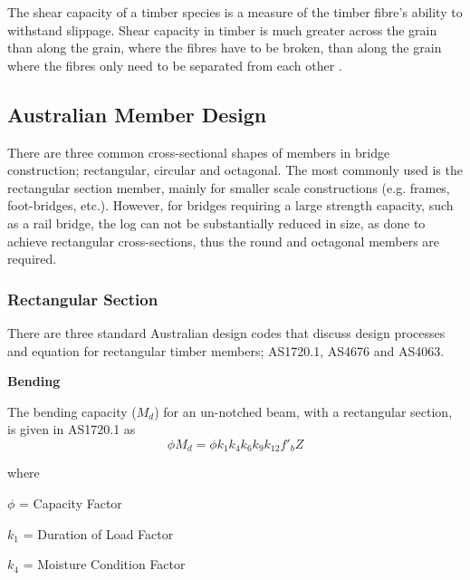 \documentclass[11pt,a4paper]{article}
\numberwithin{equation}{subsection}
\begin{document}
	\pagebreak
	 
	 \noindent
	 The shear capacity of a timber species is a measure of the timber fibre's ability to withstand slippage. Shear capacity in timber is much greater across the grain than along the grain, where the fibres have to be broken, than along the grain where the fibres only need to be separated from each other \cite{walker_primary_2013}.
	
	
	\subsection{Australian Member Design}
	There are three common cross-sectional shapes of members in bridge construction; rectangular, circular and octagonal. The most commonly used is the rectangular section member, mainly for smaller scale constructions (e.g. frames, foot-bridges, etc.). However, for bridges requiring a large strength capacity, such as a rail bridge, the log can not be substantially reduced in size, as done to achieve rectangular cross-sections, thus the round and octagonal members are required. 
	
	
	\subsubsection{Rectangular Section}
	There are three standard Australian design codes that discuss design processes and equation for rectangular timber members; AS1720.1, AS4676 and AS4063. 

	 \vspace*{\baselineskip}
	 
	\noindent
	\textbf{Bending}\par
	
	\noindent
	The bending capacity ($M_{d}$) for an un-notched beam, with a rectangular section, is given in AS1720.1 as
	\begin{equation}
	\phi M_{d} = \phi k_{1} k_{4} k_{6} k_{9} k_{12} f'_{b} Z
	\end{equation}
	
	 where 
	 
	 $ \phi $ = Capacity Factor\par
	 
	 $ k_{1} $ = Duration of Load Factor\par
	 
	 $ k_{4} $ = Moisture Condition Factor\par
	 
\end{document}
